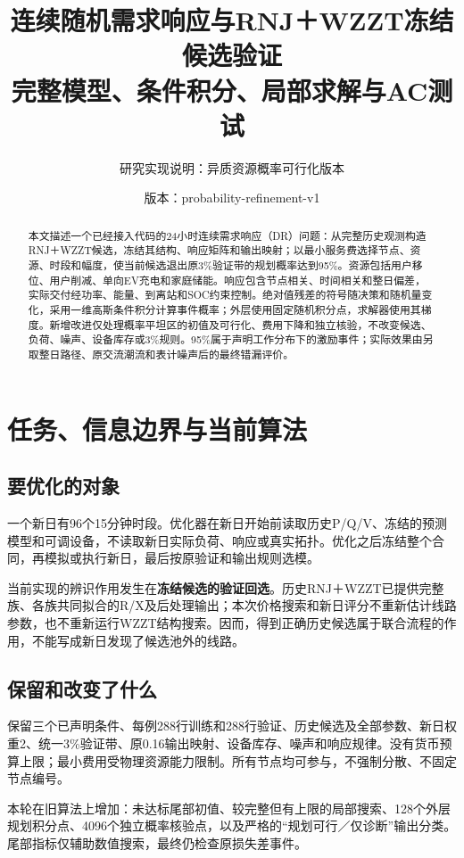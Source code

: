 \documentclass[UTF8,a4paper,11pt]{ctexart}
\title{连续随机需求响应与RNJ＋WZZT冻结候选验证\\\large 完整模型、条件积分、局部求解与AC测试}
\author{研究实现说明：异质资源概率可行化版本}
\date{版本：probability-refinement-v1}
\begin{document}
\maketitle
\begin{abstract}
本文描述一个已经接入代码的24小时连续需求响应（DR）问题：从完整历史观测构造RNJ＋WZZT候选，冻结其结构、响应矩阵和输出映射；以最小服务费选择节点、资源、时段和幅度，使当前候选退出原3\%验证带的规划概率达到95\%。资源包括用户移位、用户削减、单向EV充电和家庭储能。响应包含节点相关、时间相关和整日偏差，实际交付经功率、能量、到离站和SOC约束控制。绝对值残差的符号随决策和随机量变化，采用一维高斯条件积分计算事件概率；外层使用固定随机积分点，求解器使用其梯度。新增改进仅处理概率平坦区的初值及可行化、费用下降和独立核验，不改变候选、负荷、噪声、设备库存或3\%规则。95\%属于声明工作分布下的激励事件；实际效果由另取整日路径、原交流潮流和表计噪声后的最终错漏评价。
\end{abstract}
\tableofcontents\newpage

\section{任务、信息边界与当前算法}
\subsection{要优化的对象}
一个新日有96个15分钟时段。优化器在新日开始前读取历史P/Q/V、冻结的预测模型和可调设备，不读取新日实际负荷、响应或真实拓扑。优化之后冻结整个合同，再模拟或执行新日，最后按原验证和输出规则选模。

当前实现的辨识作用发生在\textbf{冻结候选的验证回选}。历史RNJ＋WZZT已提供完整族、各族共同拟合的R/X及后处理输出；本次价格搜索和新日评分不重新估计线路参数，也不重新运行WZZT结构搜索。因而，得到正确历史候选属于联合流程的作用，不能写成新日发现了候选池外的线路。

\subsection{保留和改变了什么}
保留三个已声明条件、每例288行训练和288行验证、历史候选及全部参数、新日权重2、统一3\%验证带、原0.16输出映射、设备库存、噪声和响应规律。没有货币预算上限；最小费用受物理资源能力限制。所有节点均可参与，不强制分散、不固定节点编号。

本轮在旧算法上增加：未达标尾部初值、较完整但有上限的局部搜索、128个外层规划积分点、4096个独立概率核验点，以及严格的“规划可行／仅诊断”输出分类。尾部指标仅辅助数值搜索，最终仍检查原损失差事件。
\end{document}
